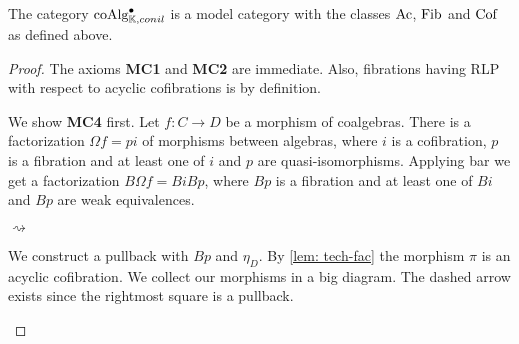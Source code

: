 \documentclass[../thesis.tex]{subfiles}
\begin{document}
            \begin{thm}\label{thm: model-coalg}
                The category $\tt{coAlg}^\bullet_{\mathbb{K}, conil}$ is a model category with the classes $\tt{Ac}$, $\tt{Fib}$ and $\tt{Cof}$ as defined above.
            \end{thm}

            \begin{proof}
                The axioms \textbf{MC1} and \textbf{MC2} are immediate. Also, fibrations having RLP with respect to acyclic cofibrations is by definition.

                We show \textbf{MC4} first. Let $f : C\rightarrow D$ be a morphism of coalgebras. There is a factorization $\Omega f = pi$ of morphisms between algebras, where $i$ is a cofibration, $p$ is a fibration and at least one of $i$ and $p$ are quasi-isomorphisms. Applying bar we get a factorization $B\Omega f = BiBp$, where $Bp$ is a fibration and at least one of $Bi$ and $Bp$ are weak equivalences.
                \begin{center}
                     $\rightsquigarrow$
                \end{center}

                We construct a pullback with $Bp$ and $\eta_D$. By \ref{lem: tech-fac} the morphism $\pi$ is an acyclic cofibration. We collect our morphisms in a big diagram. The dashed arrow exists since the rightmost square is a pullback.
                \begin{center}
                \end{center}
                

\end{proof}
\end{document}
